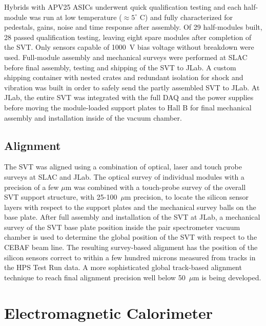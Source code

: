 \documentclass[final,3p,times,twocolumn]{elsarticle}
\begin{document}
Hybrids with APV25 ASICs underwent quick qualification testing and each half-module was run at low 
temperature ($\approx5^{\circ}$ C) and fully characterized for pedestals, gains, noise and time 
response after assembly.  Of 29 half-modules built, 28 passed qualification testing, leaving eight spare 
modules after completion of the SVT. Only sensors capable of 1000~V bias voltage without breakdown 
were used.  Full-module assembly 
and mechanical surveys were performed at SLAC before final assembly, testing and shipping of the 
SVT to JLab. A custom shipping container with nested crates and redundant isolation for shock and 
vibration was built in order to safely send the partly assembled SVT to JLab. At JLab, the entire SVT was 
integrated with the full DAQ and the power supplies before moving the module-loaded support plates to 
Hall B for final mechanical assembly and installation inside of the vacuum chamber.

\subsection{Alignment}
The SVT was aligned using a combination of optical, laser and touch probe surveys at SLAC and JLab. 
The optical survey of individual modules with a precision of a few $\mu$m was combined with a 
touch-probe survey of the overall SVT support structure, with 25-100~$\mu$m precision, to locate the 
silicon sensor layers with respect to the support plates and the mechanical survey balls on the base 
plate. After full assembly and installation of the SVT at JLab, a mechanical survey of the SVT base plate 
position inside the pair spectrometer vacuum chamber is used to determine the global position of the 
SVT with respect to the CEBAF beam line. The resulting survey-based alignment has the position of the 
silicon sensors correct to within a few hundred microns measured from tracks in the HPS Test Run 
data. A more sophisticated global track-based alignment technique to reach final alignment precision 
well below 50~$\mu$m is being developed.




\section{Electromagnetic Calorimeter}
\label{sec:ecal}
\end{document}
